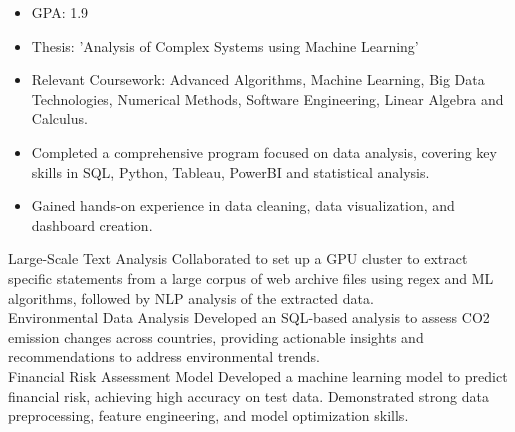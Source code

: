 \documentclass[9pt,a4paper,ragged2e,withhyper]{altacv}
\begin{document}
\begin{paracol}{2}
            \begin{itemize}
                \item GPA: 1.9
                \item Thesis: 'Analysis of Complex Systems using Machine Learning'
                \item Relevant Coursework: Advanced Algorithms, Machine Learning, Big Data Technologies, Numerical Methods, Software Engineering, Linear Algebra and Calculus.
            \end{itemize}
            \vspace{0.5em}
            \begin{itemize}
                \item Completed a comprehensive program focused on data analysis, covering key skills in SQL, Python, Tableau, PowerBI and statistical analysis.
                \item Gained hands-on experience in data cleaning, data visualization, and dashboard creation.
            \end{itemize}
            \vspace{0.5em}
        
        \cvevent
            { Large-Scale Text Analysis }
            {  }
            {}
            {}
        Collaborated to set up a GPU cluster to extract specific statements from a large corpus of web archive files using regex and ML algorithms, followed by NLP analysis of the extracted data.\\
        \vspace{0.5em}
        \cvevent
            { Environmental Data Analysis }
            {  }
            {}
            {}
        Developed an SQL-based analysis to assess CO2 emission changes across countries, providing actionable insights and recommendations to address environmental trends.\\
        \vspace{0.5em}
        \cvevent
            { Financial Risk Assessment Model }
            {  }
            {}
            {}
        Developed a machine learning model to predict financial risk, achieving high accuracy on test data. Demonstrated strong data preprocessing, feature engineering, and model optimization skills.\\
        \vspace{0.5em}

        
    \end{paracol}
\end{document}
